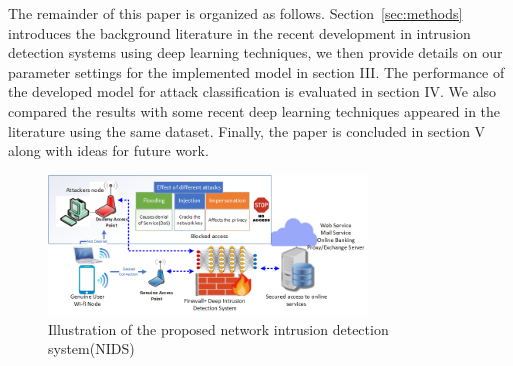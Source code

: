 \documentclass[letterpaper, 10pt, conference]{ieeeconf} %
\newcommand{\sect}[1]{Section~\ref{#1}}
\begin{document}



The remainder of this paper is organized as follows. \sect{sec:methods} introduces the background literature in the recent development in intrusion detection systems using deep learning techniques, we then provide details on our parameter settings for the implemented model in section III. The performance of the developed model for attack classification is evaluated in section IV. We also compared the results with some recent deep learning techniques appeared in the literature using the same dataset. Finally, the paper is concluded in section V along with ideas for future work.



 \begin{figure}
    \centering
  \includegraphics[width=0.755\textwidth]{Figures/NIDS.png}
    \caption{Illustration of the proposed network intrusion detection system(NIDS)}
    \label{fig:NIDS}
  \end{figure}
  

\end{document}

